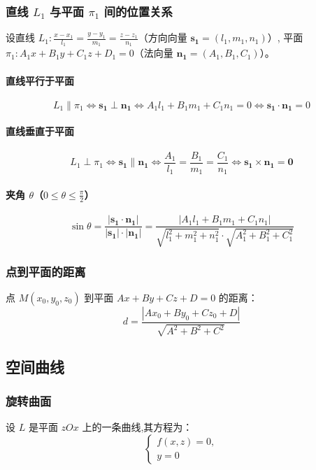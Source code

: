 \documentclass[UTF8]{ctexart}
\theoremstyle{remark}
\begin{document}
			
			\subsubsection*{直线 \(L_1\) 与平面 \(\pi_1\) 间的位置关系}
			设直线 \(L_1: \frac{x - x_1}{l_1} = \frac{y - y_1}{m_1} = \frac{z - z_1}{n_1}\)（方向向量 \(\boldsymbol{s_1} = (l_1, m_1, n_1)\)）,  
			平面 \(\pi_1: A_1x + B_1y + C_1z + D_1 = 0\)（法向量 \(\boldsymbol{n_1} = (A_1, B_1, C_1)\)）。  
			
			\paragraph{直线平行于平面}  
			\[ L_1 \parallel \pi_1 \Leftrightarrow \boldsymbol{s_1} \perp \boldsymbol{n_1} \Leftrightarrow A_1l_1 + B_1m_1 + C_1n_1 = 0 \Leftrightarrow \boldsymbol{s_1} \cdot \boldsymbol{n_1} = 0 \]  
			
			\paragraph{直线垂直于平面}  
			\[ L_1 \perp \pi_1 \Leftrightarrow \boldsymbol{s_1} \parallel \boldsymbol{n_1} \Leftrightarrow \frac{A_1}{l_1} = \frac{B_1}{m_1} = \frac{C_1}{n_1} \Leftrightarrow \boldsymbol{s_1} \times \boldsymbol{n_1} = \boldsymbol{0} \]  
			
			\paragraph{夹角 \(\theta\)（\(0 \leqslant \theta \leqslant \frac{\pi}{2}\)）}  
			\[ \sin\theta = \frac{|\boldsymbol{s_1} \cdot \boldsymbol{n_1}|}{|\boldsymbol{s_1}| \cdot |\boldsymbol{n_1}|} = \frac{|A_1l_1 + B_1m_1 + C_1n_1|}{\sqrt{l_1^2 + m_1^2 + n_1^2} \cdot \sqrt{A_1^2 + B_1^2 + C_1^2}} \]  
			
			
			\subsubsection*{点到平面的距离}
			点 \(M(x_0, y_0, z_0)\) 到平面 \(Ax + By + Cz + D = 0\) 的距离：  
			\[ d = \frac{|Ax_0 + By_0 + Cz_0 + D|}{\sqrt{A^2 + B^2 + C^2}} \]  
			
			
			\subsection{空间曲线}
			\subsubsection{旋转曲面}
			设 \( L \) 是平面 \( zOx \) 上的一条曲线,其方程为：  
			\[ \begin{cases} 
				f(x, z) = 0, \\ 
				y = 0 
			\end{cases} \]  
			
\end{document}
